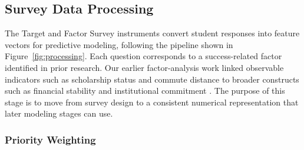 \documentclass[letterpaper,11pt]{article}
\begin{document}
\subsection{Survey Data Processing}\label{subsec:dataprocessing}

The Target and Factor Survey instruments convert student responses into feature vectors for predictive modeling, following the pipeline shown in Figure~\ref{fig:processing}. Each question corresponds to a success-related factor identified in prior research. Our earlier factor-analysis work linked observable indicators such as scholarship status and commute distance to broader constructs such as financial stability and institutional commitment \parencite{factoranalysis2023}. The purpose of this stage is to move from survey design to a consistent numerical representation that later modeling stages can use.

\subsubsection{Priority Weighting}
\end{document}
